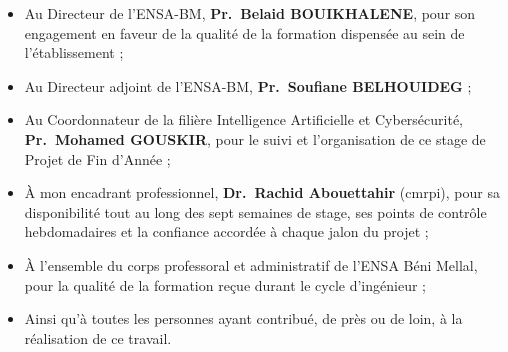 \documentclass[12pt, a4paper, oneside]{report}
\begin{document}
\begin{itemize}
  \item Au Directeur de l'ENSA-BM, \textbf{Pr.~Belaid BOUIKHALENE}, pour son engagement en faveur de la qualité de la formation dispensée au sein de l'établissement ;
  \item Au Directeur adjoint de l'ENSA-BM, \textbf{Pr.~Soufiane BELHOUIDEG} ;
  \item Au Coordonnateur de la filière Intelligence Artificielle et Cybersécurité, \textbf{Pr.~Mohamed GOUSKIR}, pour le suivi et l'organisation de ce stage de Projet de Fin d'Année ;
  \item À mon encadrant professionnel, \textbf{Dr.~Rachid Abouettahir} (\gls{cmrpi}), pour sa disponibilité tout au long des sept semaines de stage, ses points de contrôle hebdomadaires et la confiance accordée à chaque jalon du projet ;
  \item À l'ensemble du corps professoral et administratif de l'ENSA Béni Mellal, pour la qualité de la formation reçue durant le cycle d'ingénieur ;
  \item Ainsi qu'à toutes les personnes ayant contribué, de près ou de loin, à la réalisation de ce travail.
\end{itemize}

\newpage



\tableofcontents
\newpage

\listoffigures
{}
\newpage

\listoftables
{}
\newpage

\listofalgorithms
{}
\newpage

\printglossary[type=\acronymtype, title={Liste des abréviations}, toctitle={Liste des abréviations}]
\newpage




\end{document}
